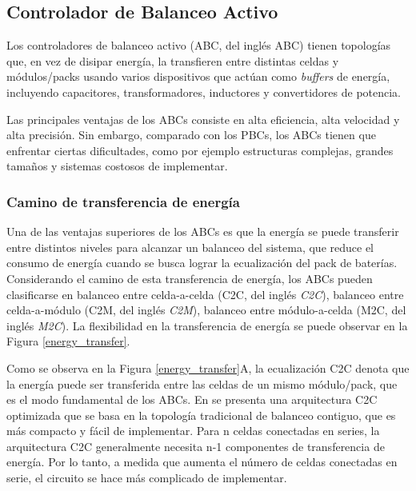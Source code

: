 \subsection{Controlador de Balanceo Activo}

Los controladores de balanceo activo (\acrshort{ABC}, del ingl\'es \acrlong{ABC})
tienen topolog\'ias que, en vez de disipar energ\'ia, la transfieren entre
distintas celdas y m\'odulos/packs usando varios dispositivos que act\'uan como
\emph{buffers} de energ\'ia, incluyendo capacitores, transformadores, inductores
y convertidores de potencia.

Las principales ventajas de los \acrshort{ABC}s consiste en alta eficiencia,
alta velocidad y alta precisi\'on. Sin embargo, comparado con los 
\acrshort{PBC}s, los \acrshort{ABC}s tienen que enfrentar ciertas dificultades, 
como por ejemplo estructuras complejas, grandes tamaños y sistemas costosos de 
implementar.

\subsubsection{Camino de transferencia de energ\'ia}

Una de las ventajas superiores de los \acrshort{ABC}s es que la energ\'ia se
puede transferir entre distintos niveles para alcanzar un balanceo del sistema,
que reduce el consumo de energ\'ia cuando se busca lograr la ecualizaci\'on del
pack de bater\'ias. Considerando el camino de esta transferencia de energ\'ia,
los \acrshort{ABC}s pueden clasificarse en balanceo entre celda-a-celda
(\acrshort{C2C}, del ingl\'es \emph{\acrlong{C2C}}), balanceo entre
celda-a-m\'odulo (\acrshort{C2M}, del ingl\'es \emph{\acrlong{C2M}}), balanceo
entre m\'odulo-a-celda (\acrshort{M2C}, del ingl\'es \emph{\acrlong{M2C}}). La
flexibilidad en la transferencia de energ\'ia se puede observar en la Figura
\ref{energy_transfer}.

Como se observa en la Figura \ref{energy_transfer}A, la ecualizaci\'on
\acrshort{C2C} denota que la energ\'ia puede ser transferida entre las celdas de
un mismo m\'odulo/pack, que es el modo fundamental de los \acrshort{ABC}s. En
\cite{phung_bal} se presenta una arquitectura \acrshort{C2C} optimizada que se 
basa en la topolog\'ia tradicional de balanceo contiguo, que es m\'as compacto y 
f\'acil de implementar. Para n celdas conectadas en series, la arquitectura 
\acrshort{C2C} generalmente necesita n-1 componentes de transferencia de 
energ\'ia. Por lo tanto, a medida que aumenta el n\'umero de celdas conectadas 
en serie, el circuito se hace m\'as complicado de implementar.


